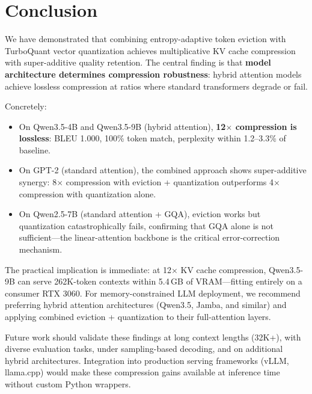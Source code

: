 \documentclass[11pt]{article}
\begin{document}
\section{Conclusion}
\label{sec:conclusion}

We have demonstrated that combining entropy-adaptive token eviction with TurboQuant vector quantization achieves multiplicative KV cache compression with super-additive quality retention.  The central finding is that \textbf{model architecture determines compression robustness}: hybrid attention models achieve lossless compression at ratios where standard transformers degrade or fail.

Concretely:
\begin{itemize}[leftmargin=*]
    \item On Qwen3.5-4B and Qwen3.5-9B (hybrid attention), \textbf{12$\times$ compression is lossless}: BLEU 1.000, 100\% token match, perplexity within 1.2--3.3\% of baseline.
    \item On GPT-2 (standard attention), the combined approach shows super-additive synergy: 8$\times$ compression with eviction + quantization outperforms 4$\times$ compression with quantization alone.
    \item On Qwen2.5-7B (standard attention + GQA), eviction works but quantization catastrophically fails, confirming that GQA alone is not sufficient---the linear-attention backbone is the critical error-correction mechanism.
\end{itemize}

The practical implication is immediate: at 12$\times$ KV cache compression, Qwen3.5-9B can serve 262K-token contexts within 5.4\,GB of VRAM---fitting entirely on a consumer RTX 3060.  For memory-constrained LLM deployment, we recommend preferring hybrid attention architectures (Qwen3.5, Jamba, and similar) and applying combined eviction + quantization to their full-attention layers.

Future work should validate these findings at long context lengths (32K+), with diverse evaluation tasks, under sampling-based decoding, and on additional hybrid architectures.  Integration into production serving frameworks (vLLM, llama.cpp) would make these compression gains available at inference time without custom Python wrappers.
\end{document}
